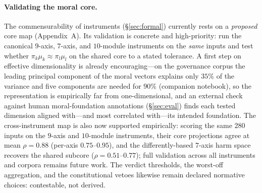 \paragraph{Validating the moral core.} The commensurability of instruments
(\S\ref{sec:formal}) currently rests on a \emph{proposed} core map (Appendix~A). Its
validation is concrete and high-priority: run the canonical $9$-axis, $7$-axis, and
$10$-module instruments on the \emph{same} inputs and test whether
$\pi_k\mu_k\approx\pi_l\mu_l$ on the shared core to a stated tolerance. A first step on
effective dimensionality is already encouraging---on the governance corpus the leading
principal component of the moral vectors explains only $35\%$ of the variance and five
components are needed for $90\%$ (companion notebook), so the representation is empirically far
from one-dimensional, and an external check against human moral-foundation annotations
(\S\ref{sec:eval}) finds each tested dimension aligned with---and most correlated with---its
intended foundation. The cross-instrument map is also now supported empirically: scoring the
same $280$ inputs on the $9$-axis and $10$-module instruments, their core projections agree at
mean $\rho=0.88$ (per-axis $0.75$--$0.95$), and the differently-based $7$-axis harm space
recovers the shared subcore ($\rho=0.51$--$0.77$); full validation across all instruments and
corpora remains future work. The verdict thresholds, the worst-off aggregation, and the
constitutional vetoes likewise remain declared normative choices: contestable, not derived.

